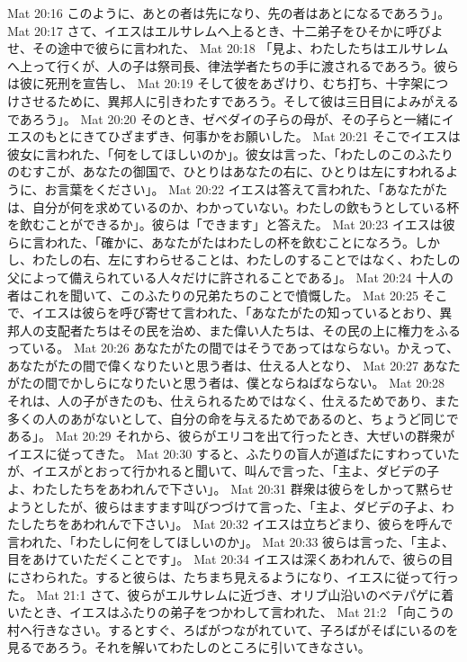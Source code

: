 Mat 20:16  このように、あとの者は先になり、先の者はあとになるであろう」。
Mat 20:17  さて、イエスはエルサレムへ上るとき、十二弟子をひそかに呼びよせ、その途中で彼らに言われた、
Mat 20:18  「見よ、わたしたちはエルサレムへ上って行くが、人の子は祭司長、律法学者たちの手に渡されるであろう。彼らは彼に死刑を宣告し、
Mat 20:19  そして彼をあざけり、むち打ち、十字架につけさせるために、異邦人に引きわたすであろう。そして彼は三日目によみがえるであろう」。
Mat 20:20  そのとき、ゼベダイの子らの母が、その子らと一緒にイエスのもとにきてひざまずき、何事かをお願いした。
Mat 20:21  そこでイエスは彼女に言われた、「何をしてほしいのか」。彼女は言った、「わたしのこのふたりのむすこが、あなたの御国で、ひとりはあなたの右に、ひとりは左にすわれるように、お言葉をください」。
Mat 20:22  イエスは答えて言われた、「あなたがたは、自分が何を求めているのか、わかっていない。わたしの飲もうとしている杯を飲むことができるか」。彼らは「できます」と答えた。
Mat 20:23  イエスは彼らに言われた、「確かに、あなたがたはわたしの杯を飲むことになろう。しかし、わたしの右、左にすわらせることは、わたしのすることではなく、わたしの父によって備えられている人々だけに許されることである」。
Mat 20:24  十人の者はこれを聞いて、このふたりの兄弟たちのことで憤慨した。
Mat 20:25  そこで、イエスは彼らを呼び寄せて言われた、「あなたがたの知っているとおり、異邦人の支配者たちはその民を治め、また偉い人たちは、その民の上に権力をふるっている。
Mat 20:26  あなたがたの間ではそうであってはならない。かえって、あなたがたの間で偉くなりたいと思う者は、仕える人となり、
Mat 20:27  あなたがたの間でかしらになりたいと思う者は、僕とならねばならない。
Mat 20:28  それは、人の子がきたのも、仕えられるためではなく、仕えるためであり、また多くの人のあがないとして、自分の命を与えるためであるのと、ちょうど同じである」。
Mat 20:29  それから、彼らがエリコを出て行ったとき、大ぜいの群衆がイエスに従ってきた。
Mat 20:30  すると、ふたりの盲人が道ばたにすわっていたが、イエスがとおって行かれると聞いて、叫んで言った、「主よ、ダビデの子よ、わたしたちをあわれんで下さい」。
Mat 20:31  群衆は彼らをしかって黙らせようとしたが、彼らはますます叫びつづけて言った、「主よ、ダビデの子よ、わたしたちをあわれんで下さい」。
Mat 20:32  イエスは立ちどまり、彼らを呼んで言われた、「わたしに何をしてほしいのか」。
Mat 20:33  彼らは言った、「主よ、目をあけていただくことです」。
Mat 20:34  イエスは深くあわれんで、彼らの目にさわられた。すると彼らは、たちまち見えるようになり、イエスに従って行った。
Mat 21:1  さて、彼らがエルサレムに近づき、オリブ山沿いのベテパゲに着いたとき、イエスはふたりの弟子をつかわして言われた、
Mat 21:2  「向こうの村へ行きなさい。するとすぐ、ろばがつながれていて、子ろばがそばにいるのを見るであろう。それを解いてわたしのところに引いてきなさい。
